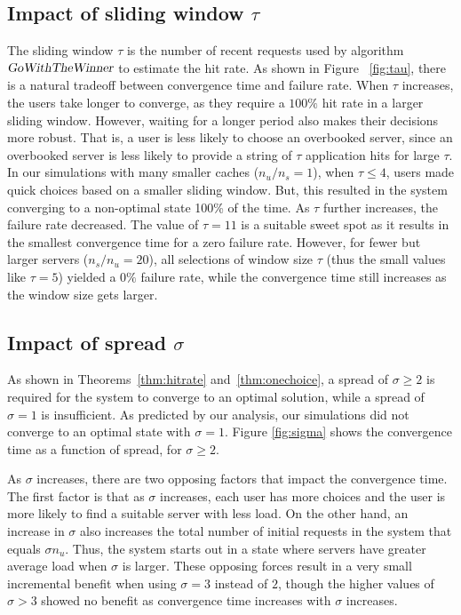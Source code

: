 \documentclass[conference]{IEEEtran}
\begin{document}
\subsection{Impact of sliding window $\tau$}



The sliding window $\tau$ is the number of recent requests used by algorithm $\textsl{GoWithTheWinner}$ to estimate the hit rate. As shown in Figure ~\ref{fig:tau}, there is a natural tradeoff between convergence time and failure rate. When $\tau$ increases, the users take longer to converge, as they require a $100\%$ hit rate in a larger sliding window. However, waiting for a longer period also makes their decisions more robust. That is, a user is  less likely to choose an overbooked server, since an overbooked server is less likely to provide a string of $\tau$ application hits for large $\tau$. In our simulations with many smaller caches ($n_u/n_s = 1$), when $\tau \leq 4$, users made quick choices based on a smaller sliding window. But, this resulted in the system converging to a non-optimal state 100\% of the time. As $\tau$ further increases, the failure rate decreased. The value of $\tau = 11$ is a suitable sweet spot as it  results in the  smallest  convergence time for a zero failure rate. However, for fewer but larger servers ($n_s/n_u = 20$), all selections of window size $\tau$ (thus the small values like $\tau=5$) yielded a $0\%$ failure rate, while the convergence time still increases as the window size gets larger.






\subsection{Impact of spread $\sigma$}
As shown in Theorems~\ref{thm:hitrate} and~\ref{thm:onechoice}, a spread of $\sigma \geq 2$  is required for the system to converge to an optimal solution, while a spread of $\sigma=1$ is insufficient. As predicted by our analysis, our simulations did not converge to an optimal state with $\sigma = 1$. Figure \ref{fig:sigma} shows the  convergence time as a function of spread, for  $\sigma \geq 2$. 



As  $\sigma$ increases, there are two opposing factors that impact the convergence time. The first factor is that  as $\sigma$ increases, each user has more choices and the user is more likely to find a suitable server with less load. On the other hand, an increase in $\sigma$ also increases the total number of initial requests in the system that equals $\sigma n_u$. Thus, the system starts out in a state where servers have greater average load when $\sigma$ is larger. These opposing forces result in a very small incremental benefit when using $\sigma = 3$ instead of $2$, though the higher values of $\sigma > 3$ showed no benefit as convergence time increases with $\sigma$ increases.
\end{document}
